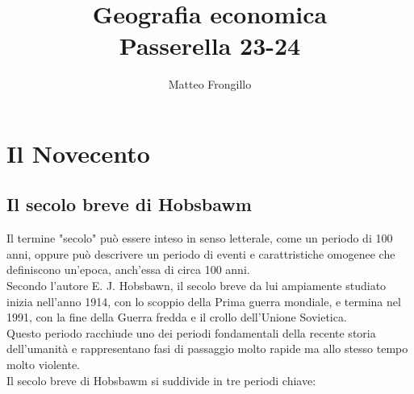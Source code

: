 \documentclass{article}
\title{\textbf{Geografia economica\\Passerella 23-24}}
\author{Matteo Frongillo}
\begin{document}
\maketitle
\tableofcontents
\pagebreak

\section{Il Novecento}
\subsection{Il secolo breve di Hobsbawm}

Il termine "secolo" può essere inteso in senso letterale, come un periodo di 100 anni, oppure può
descrivere un periodo di eventi e carattristiche omogenee che definiscono un'epoca, anch'essa
di circa 100 anni.\\
Secondo l'autore E. J. Hobsbawn, il secolo breve da lui ampiamente studiato inizia nell'anno
1914, con lo scoppio della Prima guerra mondiale, e termina nel 1991, con la fine della
Guerra fredda e il crollo dell'Unione Sovietica.\\
Questo periodo racchiude uno dei periodi fondamentali della recente storia dell'umanità e 
rappresentano fasi di passaggio molto rapide ma allo stesso tempo molto violente.\\
Il secolo breve di Hobsbawm si suddivide in tre periodi chiave:
\end{document}
